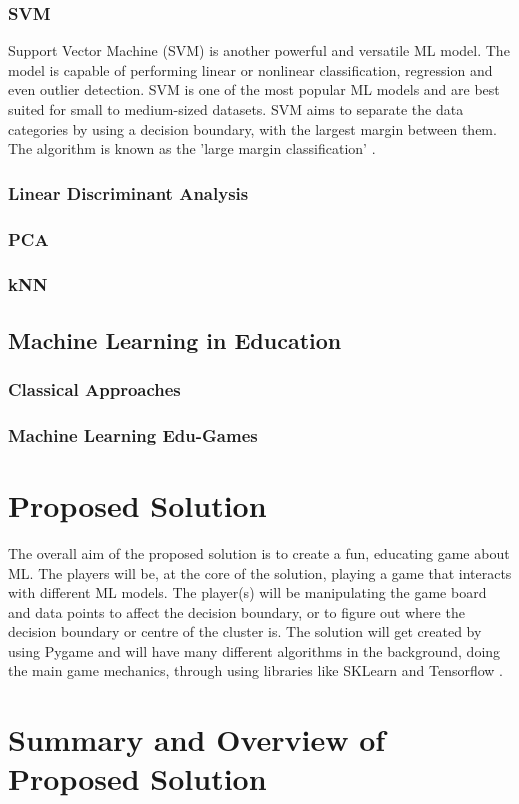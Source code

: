 	\subsubsection{SVM}
	Support Vector Machine (SVM) is another powerful and versatile ML model. The model is capable of performing linear or nonlinear classification, regression and even outlier detection. SVM is one of the most popular ML models and are best suited for small to medium-sized datasets. SVM aims to separate the data categories by using a decision boundary, with the largest margin between them. The algorithm is known as the 'large margin classification' \cite{geron2019hands}.
	
	\subsubsection{Linear Discriminant Analysis}
	
	\subsubsection{PCA}
	
	\subsubsection{kNN}
	
	
	\subsection{Machine Learning in Education}
	
	\subsubsection{Classical Approaches}
	
	
	\subsubsection{Machine Learning Edu-Games}
	
	\section{Proposed Solution}
	The overall aim of the proposed solution is to create a fun, educating game about ML. The players will be, at the core of the solution, playing a game that interacts with different ML models. The player(s) will be manipulating the game board and data points to affect the decision boundary, or to figure out where the decision boundary or centre of the cluster is. The solution will get created by using  Pygame and will have many different algorithms in the background, doing the main game mechanics, through using libraries like SKLearn \cite{sklearn_api} and Tensorflow \cite{tensorflow2015-whitepaper}.
	
	\section{Summary and Overview of Proposed Solution}
	